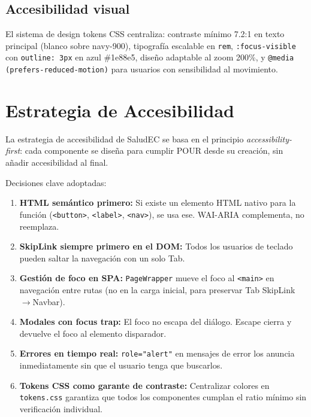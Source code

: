 \documentclass[12pt, a4paper]{article}
\begin{document}
\subsection{Accesibilidad visual}

El sistema de design tokens CSS centraliza: contraste mínimo 7.2:1 en texto principal (blanco sobre navy-900), tipografía escalable en \texttt{rem}, \texttt{:focus-visible} con \texttt{outline: 3px} en azul \#1e88e5, diseño adaptable al zoom 200\%, y \texttt{@media (prefers-reduced-motion)} para usuarios con sensibilidad al movimiento.

\section{Estrategia de Accesibilidad}

La estrategia de accesibilidad de SaludEC se basa en el principio \textit{accessibility-first}: cada componente se diseña para cumplir POUR desde su creación, sin añadir accesibilidad al final.

Decisiones clave adoptadas:
\begin{enumerate}
  \item \textbf{HTML semántico primero:} Si existe un elemento HTML nativo para la función (\texttt{<button>}, \texttt{<label>}, \texttt{<nav>}), se usa ese. WAI-ARIA complementa, no reemplaza.
  \item \textbf{SkipLink siempre primero en el DOM:} Todos los usuarios de teclado pueden saltar la navegación con un solo Tab.
  \item \textbf{Gestión de foco en SPA:} \texttt{PageWrapper} mueve el foco al \texttt{<main>} en navegación entre rutas (no en la carga inicial, para preservar Tab SkipLink$\to$Navbar).
  \item \textbf{Modales con focus trap:} El foco no escapa del diálogo. Escape cierra y devuelve el foco al elemento disparador.
  \item \textbf{Errores en tiempo real:} \texttt{role="alert"} en mensajes de error los anuncia inmediatamente sin que el usuario tenga que buscarlos.
  \item \textbf{Tokens CSS como garante de contraste:} Centralizar colores en \texttt{tokens.css} garantiza que todos los componentes cumplan el ratio mínimo sin verificación individual.
\end{enumerate}

\end{document}
